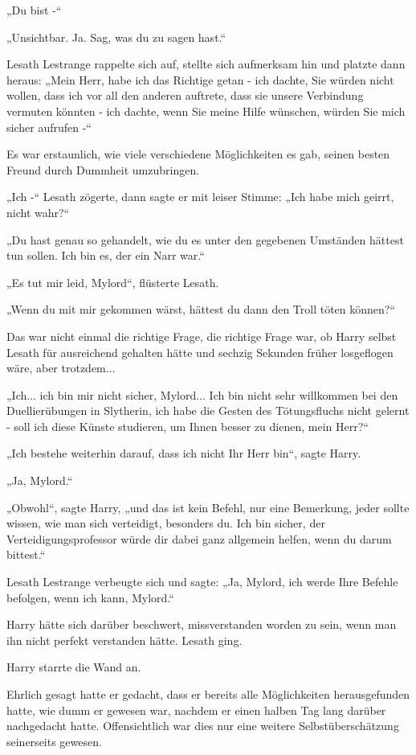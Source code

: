 {„Du bist -“

„Unsichtbar. Ja. Sag, was du zu sagen hast.“

Lesath Lestrange rappelte sich auf, stellte sich aufmerksam hin und platzte dann heraus: „Mein Herr, habe ich das Richtige getan - ich dachte, Sie würden nicht wollen, dass ich vor all den anderen auftrete, dass sie unsere Verbindung vermuten könnten - ich dachte, wenn Sie meine Hilfe wünschen, würden Sie mich sicher aufrufen -“

Es war erstaunlich, wie viele verschiedene Möglichkeiten es gab, seinen besten Freund durch Dummheit umzubringen.

„Ich -“ Lesath zögerte, dann sagte er mit leiser Stimme: „Ich habe mich geirrt, nicht wahr?“

„Du hast genau so gehandelt, wie du es unter den gegebenen Umständen hättest tun sollen. Ich bin es, der ein Narr war.“

„Es tut mir leid, Mylord“, flüsterte Lesath.

„Wenn du mit mir gekommen wärst, hättest du dann den Troll töten können?“

Das war nicht einmal die richtige Frage, die richtige Frage war, ob Harry selbst Lesath für ausreichend gehalten hätte und sechzig Sekunden früher losgeflogen wäre, aber trotzdem...

„Ich... ich bin mir nicht sicher, Mylord... Ich bin nicht sehr willkommen bei den Duellierübungen in Slytherin, ich habe die Gesten des Tötungsfluchs nicht gelernt - soll ich diese Künste studieren, um Ihnen besser zu dienen, mein Herr?“

„Ich bestehe weiterhin darauf, dass ich nicht Ihr Herr bin“, sagte Harry.

„Ja, Mylord.“

„Obwohl“, sagte Harry, „und das ist kein Befehl, nur eine Bemerkung, jeder sollte wissen, wie man sich verteidigt, besonders du. Ich bin sicher, der Verteidigungsprofessor würde dir dabei ganz allgemein helfen, wenn du darum bittest.“

Lesath Lestrange verbeugte sich und sagte: „Ja, Mylord, ich werde Ihre Befehle befolgen, wenn ich kann, Mylord.“

Harry hätte sich darüber beschwert, missverstanden worden zu sein, wenn man ihn nicht perfekt verstanden hätte. Lesath ging.

Harry starrte die Wand an.

Ehrlich gesagt hatte er gedacht, dass er bereits alle Möglichkeiten herausgefunden hatte, wie dumm er gewesen war, nachdem er einen halben Tag lang darüber nachgedacht hatte. Offensichtlich war dies nur eine weitere Selbstüberschätzung seinerseits gewesen.

}
